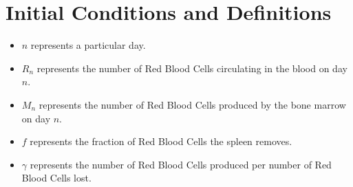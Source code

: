 \section{Initial Conditions and Definitions}

\begin{itemize}
\item $n$ represents a particular day.
\item $R_n$ represents the number of Red Blood Cells circulating in the blood on day $n$.
\item $M_n$ represents the number of Red Blood Cells produced by the bone marrow on day $n$.
\item $f$ represents the fraction of Red Blood Cells the spleen removes.
\item $\gamma$ represents the number of Red Blood Cells produced per number of Red Blood Cells lost.
\end{itemize}
